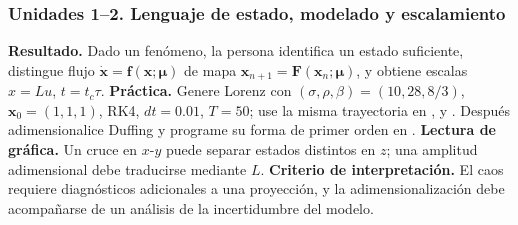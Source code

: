 \subsubsection*{Unidades 1--2. Lenguaje de estado, modelado y escalamiento}
\textbf{Resultado.} Dado un fenómeno, la persona identifica un estado suficiente,
distingue flujo \(\dot{\mathbf{x}}=\mathbf f(\mathbf{x};\boldsymbol\mu)\) de mapa
\(\mathbf{x}_{n+1}=\mathbf F(\mathbf{x}_n;\boldsymbol\mu)\), y obtiene escalas
\(x=L u\), \(t=t_c\tau\). \textbf{Práctica.} Genere Lorenz con
\((\sigma,\rho,\beta)=(10,28,8/3)\), \(\mathbf{x}_0=(1,1,1)\), RK4,
\(dt=0.01\), \(T=50\); use la misma trayectoria en ,
 y . Después adimensionalice Duffing y
programe su forma de primer orden en .
\textbf{Lectura de gráfica.} Un cruce en \(x\)-\(y\) puede separar estados distintos
en \(z\); una amplitud adimensional debe traducirse mediante \(L\).
\textbf{Criterio de interpretación.} El caos requiere diagnósticos adicionales a una proyección, y la adimensionalización debe acompañarse de un análisis de la incertidumbre del modelo.

